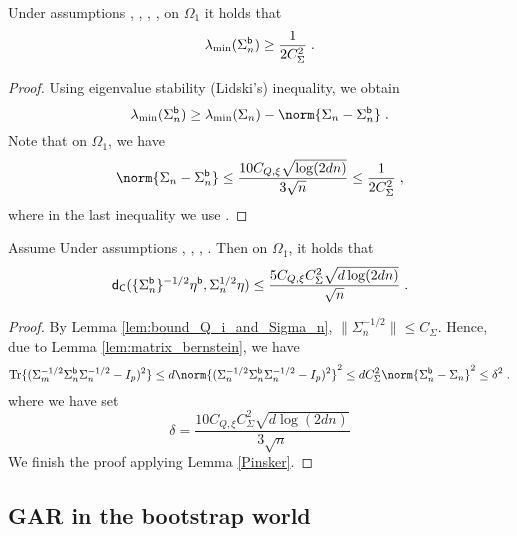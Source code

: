 \begin{corollary}
\label{lambda min boot}
Under assumptions , , , , on $\Omega_1$ it holds that 
\begin{equation}
    \lambda_{\min}(\Sigma_n^{\mathsf{b}}) \geq \frac{1}{2 C_\Sigma^2} \;. 
\end{equation}
\end{corollary}
\begin{proof}
Using eigenvalue stability (Lidski's) inequality, we obtain 
\begin{equation}
    \lambda_{\min}(\Sigma_n^\boot) \geq \lambda_{\min}(\Sigma_n)-\norm{\Sigma_n-\Sigma_n^\boot}\eqsp.
\end{equation}
Note that on $\Omega_1$, we have 
\begin{equation}
    \norm{\Sigma_n-\Sigma_n^\boot} \leq  \frac{10C_{Q,\xi}\sqrt{\log(2d n)}}{3\sqrt{n}} \leq \frac{1}{2C_\Sigma^2}\eqsp,
\end{equation}
where in the last inequality we use .
\end{proof}

\begin{lemma}
\label{lem: gaussion comparison boot and real} 
Assume Under assumptions , , , . Then on $\Omega_1$, it holds that
$$
\mathsf{d}_{\mathsf{C}}(\{\Sigma_n^{\mathsf{b}}\}^{-1/2} \eta^{\mathsf{b}}, \Sigma_n^{1/2}\eta) \le \frac{5C_{Q,\xi} C_\Sigma^2 \sqrt{d \log(2d n)}}{\sqrt{n}} \;.
$$
\end{lemma}
\begin{proof}
By Lemma \ref{lem:bound_Q_i_and_Sigma_n}, $\|\Sigma_n^{-1/2}\| \le C_{\Sigma}$. Hence,  due to Lemma \ref{lem:matrix_bernstein}, we have 
\begin{equation}
\trace \{ (\Sigma_m^{-1/2} \Sigma_n^\boot \Sigma_n^{-1/2} - I_p)^2 \}\leq d \norm{(\Sigma_n^{-1/2} \Sigma_n^\boot \Sigma_n^{-1/2} - I_p)^2}^2 \leq dC_\Sigma^2\norm{\Sigma_n^\boot-\Sigma_n}^2 \leq \delta^2 \eqsp.
\end{equation}
 where we have  set 
$$
\delta = \frac{10C_{Q,\xi} C_\Sigma^2 \sqrt{d \log(2d n)}}{3\sqrt{n}}
$$
We finish the proof applying Lemma \ref{Pinsker}.
\end{proof}


\subsection{GAR in the bootstrap world}

